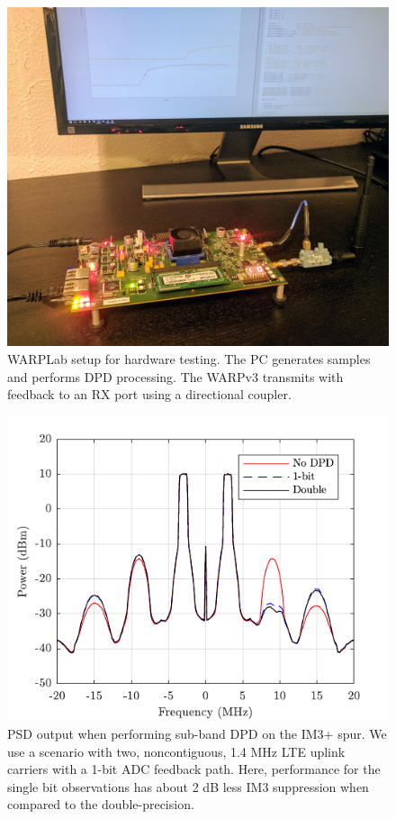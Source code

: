 \documentclass[conference]{IEEEtran}
\begin{document}
\begin{figure}[]
	\centering
	\includegraphics[width=0.8\columnwidth]{Setup.jpg}
	\caption{WARPLab setup for hardware testing. The PC generates samples and performs DPD processing. The WARPv3 transmits with feedback to an RX port using a directional coupler.}
	\label{warpsetup}
\end{figure}

\begin{figure}[]
	\centering
	\includegraphics{SubBandPSDWARP}
	\caption{PSD output when performing sub-band DPD on the IM3+ spur. We use a scenario with two, noncontiguous, 1.4 MHz LTE uplink carriers with a 1-bit ADC feedback path. Here, performance for the single bit observations has about 2 dB less IM3 suppression when compared to the double-precision. }
	\label{WARPPSD}
\end{figure}
\end{document}
